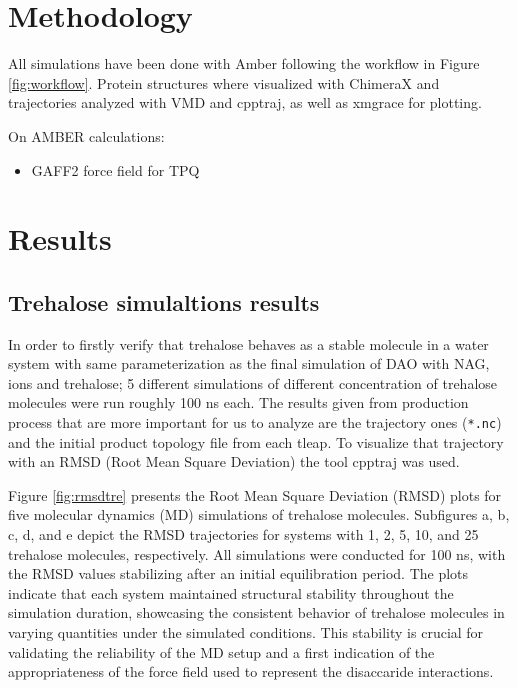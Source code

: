 \documentclass[a4paper]{article}
\begin{document}
\section{Methodology}

All simulations have been done with Amber following the workflow in Figure \ref{fig:workflow}.  Protein structures where visualized with ChimeraX \cite{Chimerax} and trajectories analyzed with  VMD\cite{HUMP96} and cpptraj\cite{roe_ptraj_2013}, as well as xmgrace\cite{turner_xmgrace_2005} for plotting.

On AMBER calculations:
\begin{itemize}
    \item GAFF2 force field\cite{he_fast_2020} for TPQ
\end{itemize}


	\section{Results}
	\label{sec:results}


\subsection{Trehalose simulaltions results}

In order to firstly verify that trehalose behaves as a stable molecule in a water system with same parameterization as the final simulation of DAO with NAG, ions and trehalose; 5 different simulations of different concentration of trehalose molecules were run roughly 100 ns each. The results given from production process that are more important for us to analyze are the trajectory ones (\texttt{*.nc}) and the initial product topology file from each tleap. To visualize that trajectory with an RMSD (Root Mean Square Deviation) the tool cpptraj was used. 



Figure \ref{fig:rmsdtre} presents the Root Mean Square Deviation (RMSD) plots for five molecular dynamics (MD) simulations of trehalose molecules. Subfigures a, b, c, d, and e depict the RMSD trajectories for systems with 1, 2, 5, 10, and 25 trehalose molecules, respectively. All simulations were conducted for 100 ns, with the RMSD values stabilizing after an initial equilibration period. The plots indicate that each system maintained structural stability throughout the simulation duration, showcasing the consistent behavior of trehalose molecules in varying quantities under the simulated conditions. This stability is crucial for validating the reliability of the MD setup and a first indication of the appropriateness of the force field used to represent the disaccaride interactions.
\end{document}
